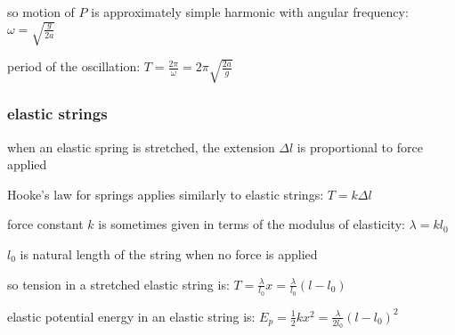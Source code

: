 so motion of $P$ is approximately simple harmonic with angular frequency: $\omega = \sqrt{\frac{g}{2a}}$

period of the oscillation: $T = \frac{2\pi}{\omega} = 2\pi \sqrt{\frac{2a}{g}} $ \eoe

\subsubsection*{elastic strings}

when an elastic spring is stretched, the extension $\Delta l$ is proportional to force applied

Hooke's law for springs applies similarly to elastic strings: $T=k\Delta l$

force constant $k$ is sometimes given in terms of the modulus of elasticity: $\lambda = kl_0$

$l_0$ is natural length of the string when no force is applied

so tension in a stretched elastic string is: $\boxed{T=\frac{\lambda}{l_0}x = \frac{\lambda}{l_0}(l-l_0)}$

elastic potential energy in an elastic string is: $\boxed{E_p = \frac{1}{2}kx^2 = \frac{\lambda}{2l_0}(l-l_0)^2}$

 \label{ex-fourstrings}


